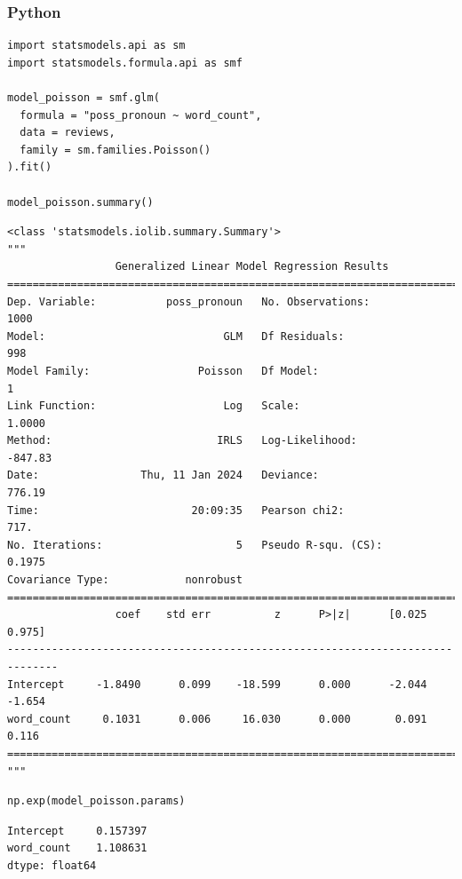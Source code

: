 \documentclass[
  letterpaper,
]{krantz}
\begin{document}
\subsubsection{Python}

\begin{verbatim}
import statsmodels.api as sm
import statsmodels.formula.api as smf

model_poisson = smf.glm(
  formula = "poss_pronoun ~ word_count",
  data = reviews,
  family = sm.families.Poisson()
).fit()

model_poisson.summary()        
\end{verbatim}

\begin{verbatim}
<class 'statsmodels.iolib.summary.Summary'>
"""
                 Generalized Linear Model Regression Results                  
==============================================================================
Dep. Variable:           poss_pronoun   No. Observations:                 1000
Model:                            GLM   Df Residuals:                      998
Model Family:                 Poisson   Df Model:                            1
Link Function:                    Log   Scale:                          1.0000
Method:                          IRLS   Log-Likelihood:                -847.83
Date:                Thu, 11 Jan 2024   Deviance:                       776.19
Time:                        20:09:35   Pearson chi2:                     717.
No. Iterations:                     5   Pseudo R-squ. (CS):             0.1975
Covariance Type:            nonrobust                                         
==============================================================================
                 coef    std err          z      P>|z|      [0.025      0.975]
------------------------------------------------------------------------------
Intercept     -1.8490      0.099    -18.599      0.000      -2.044      -1.654
word_count     0.1031      0.006     16.030      0.000       0.091       0.116
==============================================================================
"""
\end{verbatim}

\begin{verbatim}
np.exp(model_poisson.params)
\end{verbatim}

\begin{verbatim}
Intercept     0.157397
word_count    1.108631
dtype: float64
\end{verbatim}
\end{document}
